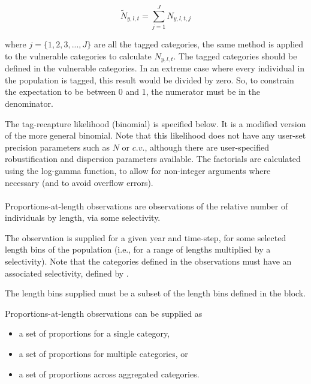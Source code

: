\begin{equation}
\tilde{N}_{y,l,t} = \sum_{j = 1}^{J} N_{y,l,t,j}
\end{equation}

where $j = \{1,2,3,...,J\}$  are all the tagged categories, the same method is applied to the vulnerable categories to calculate $N_{y,l,t}$. The tagged categories should be defined in the vulnerable categories. In an extreme case where every individual in the population is tagged, this result would be divided by zero. So, to constrain the expectation to be between 0 and 1, the numerator must be in the denominator.

The tag-recapture likelihood (binomial) is specified below. It is a modified version of the more general binomial. Note that this likelihood does not have any user-set precision parameters such as $N$ or $c.v.$, although there are user-specified robustification and dispersion parameters available. The factorials are calculated using the log-gamma function, to allow for non-integer arguments where necessary (and to avoid overflow errors).

\else

\paragraph*{}\label{sec:Observation-ProportionsAtLength}

Proportions-at-length observations are observations of the relative number of individuals by length, via some selectivity.

The observation is supplied for a given year and time-step, for some selected length bins of the population (i.e., for a range of lengths multiplied by a selectivity). Note that the categories defined in the observations must have an associated selectivity, defined by .

The length bins supplied must be a subset of the length bins defined in the  block. 

Proportions-at-length observations can be supplied as

\begin{itemize}
	\item a set of proportions for a single category,
	\item a set of proportions for multiple categories, or
	\item a set of proportions across aggregated categories.
\end{itemize}

